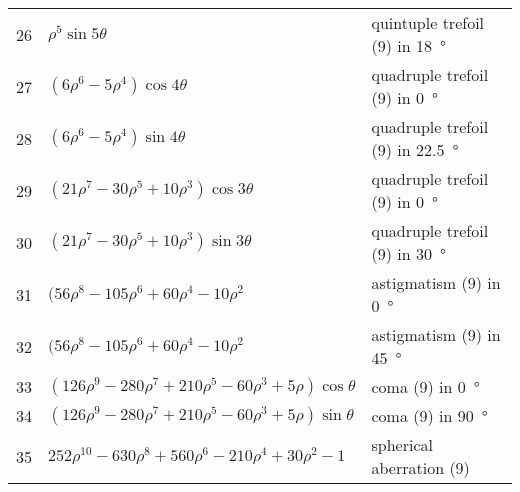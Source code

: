\begin{center}
\begin{longtable}{cll}
26    &   \( \rho^5 \sin 5 \theta \)                                                  &  quintuple trefoil (9) in \SI{18}{\degree} \\
27    &   \( (6\rho^6 - 5 \rho^4)\cos 4 \theta \)                                     &  quadruple trefoil (9) in \SI{0}{\degree} \\
28    &   \( (6\rho^6 - 5 \rho^4)\sin 4 \theta \)                                     &  quadruple trefoil (9) in \SI{22.5}{\degree} \\
29    &   \( (21\rho^7 - 30 \rho^5 + 10\rho^3 )\cos 3\theta \)                        &  quadruple trefoil (9) in \SI{0}{\degree} \\
30    &   \( (21\rho^7 - 30 \rho^5 + 10\rho^3 )\sin 3\theta \)                        &  quadruple trefoil (9) in \SI{30}{\degree} \\
31    &   \( (56\rho^8 - 105\rho^6 + 60\rho^4 - 10\rho^2 \)                           &  astigmatism (9) in \SI{0}{\degree} \\
32    &   \( (56\rho^8 - 105\rho^6 + 60\rho^4 - 10\rho^2 \)                           &  astigmatism (9) in \SI{45}{\degree} \\
33    &   \( (126 \rho^9 - 280 \rho^7 + 210 \rho^5 - 60\rho^3 + 5 \rho)\cos\theta \)   & coma (9) in \SI{0}{\degree} \\
34    &   \( (126 \rho^9 - 280 \rho^7 + 210 \rho^5 - 60\rho^3 + 5 \rho)\sin\theta \)   & coma (9) in \SI{90}{\degree} \\
35    &   \( 252 \rho^{10} - 630 \rho^8 + 560 \rho^6 - 210 \rho^ 4 + 30 \rho^2 - 1 \)  & spherical aberration (9) \\
\bottomrule
\end{longtable}
\end{center}
